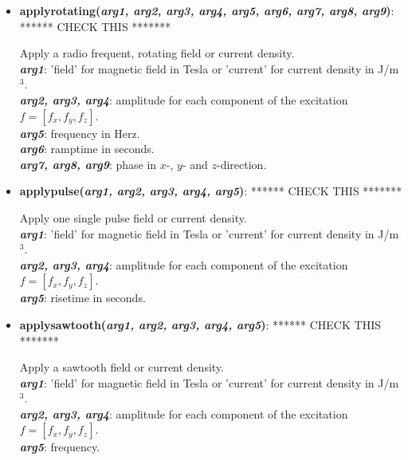 \begin{itemize}
 \item {\vspace{-0.4cm}\textbf{applyrotating(\textit{arg1, arg2, arg3, arg4, arg5, arg6, arg7, arg8, arg9})}:   ****** CHECK THIS *******
				\flushright\parbox{0.9 \textwidth}{\vspace{-0.25cm} 
				Apply a radio frequent, rotating field or current density.\\
				\textbf{\textit{arg1}}: 'field' for magnetic field in Tesla or 'current' for current density in J/m$^3$.\\
				\textbf{\textit{arg2, arg3, arg4}}: amplitude for each component of the excitation $f = [f_x, f_y, f_z]$.\\
				\textbf{\textit{arg5}}: frequency in Herz.\\
				\textbf{\textit{arg6}}: ramptime in seconds.\\
				\textbf{\textit{arg7, arg8, arg9}}: phase in $x$-, $y$- and $z$-direction.
				}\flushleft}

 \item {\vspace{-0.4cm}\textbf{applypulse(\textit{arg1, arg2, arg3, arg4, arg5})}:   ****** CHECK THIS *******
				\flushright\parbox{0.9 \textwidth}{\vspace{-0.25cm} 
				Apply one single pulse field or current density.\\
				\textbf{\textit{arg1}}: 'field' for magnetic field in Tesla or 'current' for current density in J/m$^3$.\\
				\textbf{\textit{arg2, arg3, arg4}}: amplitude for each component of the excitation $f = [f_x, f_y, f_z]$.\\
				\textbf{\textit{arg5}}: risetime in seconds.
				}\flushleft}

 \item {\vspace{-0.4cm}\textbf{applysawtooth(\textit{arg1, arg2, arg3, arg4, arg5})}:   ****** CHECK THIS *******
				\flushright\parbox{0.9 \textwidth}{\vspace{-0.25cm} 
				Apply a sawtooth field or current density.\\
				\textbf{\textit{arg1}}: 'field' for magnetic field in Tesla or 'current' for current density in J/m$^3$.\\
				\textbf{\textit{arg2, arg3, arg4}}: amplitude for each component of the excitation $f = [f_x, f_y, f_z]$.\\
				\textbf{\textit{arg5}}: frequency.
				}\flushleft}


\end{itemize}
